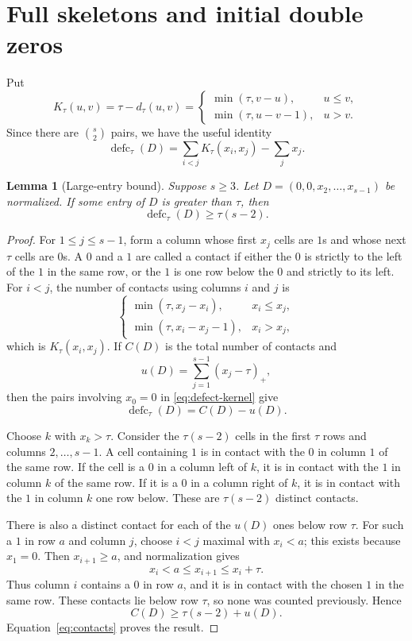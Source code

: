 \documentclass[11pt]{article}
\newtheorem{lemma}[theorem]{Lemma}
\theoremstyle{definition}
\theoremstyle{remark}
\newcommand{\defc}{\operatorname{defc}}
\begin{document}
\section{Full skeletons and initial double zeros}

Put
\[
 K_\tau(u,v)=\tau-d_\tau(u,v)
 =
 \begin{cases}
   \min(\tau,v-u),&u\le v,\\
   \min(\tau,u-v-1),&u>v.
 \end{cases}
\]
Since there are $\binom{s}{2}$ pairs, we have the useful identity
\begin{equation}
 \defc_\tau(D)
 =\sum_{i<j}K_\tau(x_i,x_j)-\sum_jx_j.
 \label{eq:defect-kernel}
\end{equation}

\begin{lemma}[Large-entry bound]
\label{lem:large-entry}
Suppose $s\ge3$.
Let $D=(0,0,x_2,\ldots,x_{s-1})$ be normalized.  If some entry of $D$ is
greater than $\tau$, then
\[
  \defc_\tau(D)\ge\tau(s-2).
\]
\end{lemma}

\begin{proof}
For $1\le j\le s-1$, form a column whose first $x_j$ cells are $1$s and
whose next $\tau$ cells are $0$s.  A $0$ and a $1$ are called a contact if
either the $0$ is strictly to the left of the $1$ in the same row, or the
$1$ is one row below the $0$ and strictly to its left.  For $i<j$, the
number of contacts using columns $i$ and $j$ is
\[
 \begin{cases}
  \min(\tau,x_j-x_i),&x_i\le x_j,\\
  \min(\tau,x_i-x_j-1),&x_i>x_j,
 \end{cases}
\]
which is $K_\tau(x_i,x_j)$.  If $C(D)$ is the total number of contacts and
\[
  u(D)=\sum_{j=1}^{s-1}(x_j-\tau)_+,
\]
then the pairs involving $x_0=0$ in \eqref{eq:defect-kernel} give
\begin{equation}
  \defc_\tau(D)=C(D)-u(D).
  \label{eq:contacts}
\end{equation}

Choose $k$ with $x_k>\tau$.  Consider the $\tau(s-2)$ cells in the first
$\tau$ rows and columns $2,\ldots,s-1$.  A cell containing $1$ is in contact
with the $0$ in column $1$ of the same row.  If the cell is a $0$ in a
column left of $k$, it is in contact with the $1$ in column $k$ of the same
row.  If it is a $0$ in a column right of $k$, it is in contact with the $1$
in column $k$ one row below.  These are $\tau(s-2)$ distinct contacts.

There is also a distinct contact for each of the $u(D)$ ones below row
$\tau$.  For such a $1$ in row $a$ and column $j$, choose $i<j$ maximal
with $x_i<a$; this exists because $x_1=0$.  Then $x_{i+1}\ge a$, and
normalization gives
\[
  x_i<a\le x_{i+1}\le x_i+\tau.
\]
Thus column $i$ contains a $0$ in row $a$, and it is in contact with the
chosen $1$ in the same row.  These contacts lie below row $\tau$, so none
was counted previously.  Hence
\[
  C(D)\ge\tau(s-2)+u(D).
\]
Equation~\eqref{eq:contacts} proves the result.
\end{proof}
\end{document}
